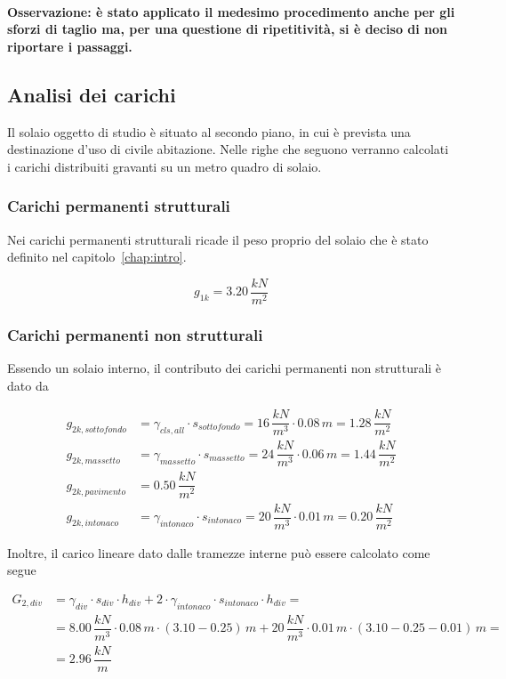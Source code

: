 \paragraph{Osservazione: è stato applicato il medesimo procedimento anche per gli sforzi di taglio ma, per una questione di ripetitività, si è deciso di non riportare i passaggi.}

\subsection{Analisi dei carichi}
Il solaio oggetto di studio è situato al secondo piano, in cui è prevista una destinazione d'uso di civile abitazione. Nelle righe che seguono verranno calcolati i carichi distribuiti gravanti su un metro quadro di solaio.

\subsubsection*{Carichi permanenti strutturali}
Nei carichi permanenti strutturali ricade il peso proprio del solaio che è stato definito nel capitolo~\ref{chap:intro}.

\[
	g_{1k} = 3.20\,\dfrac{kN}{m^2}
\]

\subsubsection*{Carichi permanenti non strutturali}
Essendo un solaio interno, il contributo dei carichi permanenti non strutturali è dato da

\begin{align*}
 g_{2k, sottofondo} &= \gamma_{cls, all}\cdot s_{sottofondo} = 16\,\dfrac{kN}{m^3}\cdot 0.08\,\si{m} = 1.28\,\dfrac{kN}{m^2}\\
 g_{2k, massetto} &= \gamma_{massetto}\cdot
 s_{massetto} = 24\,\dfrac{kN}{m^3}\cdot 0.06\,\si{m} = 1.44\,\dfrac{kN}{m^2}\\
 g_{2k, pavimento} &= 0.50\,\dfrac{kN}{m^2}\\
 g_{2k, intonaco} &= \gamma_{intonaco}\cdot s_{intonaco} = 20\,\dfrac{kN}{m^3}\cdot 0.01\,\si{m} = 0.20\,\dfrac{kN}{m^2}
\end{align*}

Inoltre, il carico lineare dato dalle tramezze interne può essere calcolato come segue

\begin{align*}
 G_{2, div} &= \gamma_{div} \cdot s_{div} \cdot h_{div} + 2 \cdot \gamma_{intonaco} \cdot s_{intonaco} \cdot h_{div} =\\ &= 8.00\,\dfrac{kN}{m^3}\cdot 0.08\,\si{m} \cdot (3.10 - 0.25)\,\si{m} + 20\,\dfrac{kN}{m^3}\cdot 0.01\,\si{m} \cdot (3.10 - 0.25 - 0.01)\,\si{m}=\\ &= 2.96\,\dfrac{kN}{m}
\end{align*}
 
